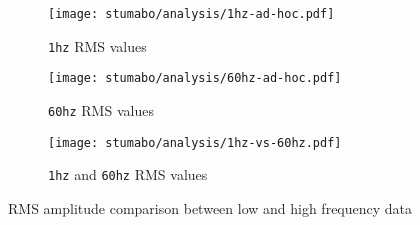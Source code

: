 \begin{figure}[htp]
    \begin{subfigure}{.495\textwidth}
        \texttt{[image: stumabo/analysis/1hz-ad-hoc.pdf]}
        \caption{\texttt{1hz} RMS values}
        \label{fig:stu_1hz_rms}
    \end{subfigure}
    \begin{subfigure}{.495\textwidth}
        \texttt{[image: stumabo/analysis/60hz-ad-hoc.pdf]}
        \caption{\texttt{60hz} RMS values}
        \label{fig:stu_60hz_rms}
    \end{subfigure}
    \begin{subfigure}{\textwidth}
        \texttt{[image: stumabo/analysis/1hz-vs-60hz.pdf]}
        \caption{\texttt{1hz} and \texttt{60hz} RMS values}
        \label{fig:stu_1_vs_60}
    \end{subfigure}
    \caption{RMS amplitude comparison between low and high frequency data}
    \label{fig:stu_3_rms}
\end{figure}

